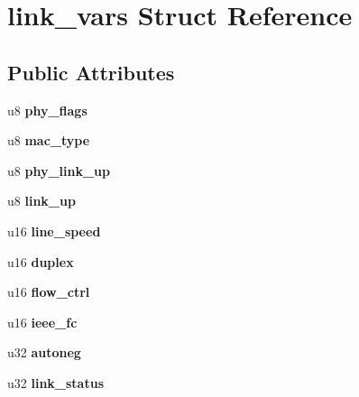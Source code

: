 \hypertarget{structlink__vars}{
\section{link\_\-vars Struct Reference}
\label{structlink__vars}
}
\subsection*{Public Attributes}
\begin{DoxyCompactItemize}
\item 
\hypertarget{structlink__vars_ae3858c7e58d3e4675ebc3232a7d4cab8}{
u8 {\bfseries phy\_\-flags}}
\label{structlink__vars_ae3858c7e58d3e4675ebc3232a7d4cab8}

\item 
\hypertarget{structlink__vars_afc0fb74b0b82da8f1e082ec60d67122d}{
u8 {\bfseries mac\_\-type}}
\label{structlink__vars_afc0fb74b0b82da8f1e082ec60d67122d}

\item 
\hypertarget{structlink__vars_a5387ddebfaae6fe5fcd41f9165dcb269}{
u8 {\bfseries phy\_\-link\_\-up}}
\label{structlink__vars_a5387ddebfaae6fe5fcd41f9165dcb269}

\item 
\hypertarget{structlink__vars_a9d4d852ac2791f83482880a51545f53d}{
u8 {\bfseries link\_\-up}}
\label{structlink__vars_a9d4d852ac2791f83482880a51545f53d}

\item 
\hypertarget{structlink__vars_a4c8c8a3a64e42c02f2b2596d73e756a4}{
u16 {\bfseries line\_\-speed}}
\label{structlink__vars_a4c8c8a3a64e42c02f2b2596d73e756a4}

\item 
\hypertarget{structlink__vars_a6d78571e6226f5ca7d044a7b7da89716}{
u16 {\bfseries duplex}}
\label{structlink__vars_a6d78571e6226f5ca7d044a7b7da89716}

\item 
\hypertarget{structlink__vars_abcd009e053dab4a365741427ede7a3aa}{
u16 {\bfseries flow\_\-ctrl}}
\label{structlink__vars_abcd009e053dab4a365741427ede7a3aa}

\item 
\hypertarget{structlink__vars_a21a7314c9ef120d240d3491285e7d695}{
u16 {\bfseries ieee\_\-fc}}
\label{structlink__vars_a21a7314c9ef120d240d3491285e7d695}

\item 
\hypertarget{structlink__vars_a908a650fbd241a693643989da8c4c24b}{
u32 {\bfseries autoneg}}
\label{structlink__vars_a908a650fbd241a693643989da8c4c24b}

\item 
\hypertarget{structlink__vars_acbc87080c71d4f14301c726bf63eea54}{
u32 {\bfseries link\_\-status}}
\label{structlink__vars_acbc87080c71d4f14301c726bf63eea54}

\end{DoxyCompactItemize}


